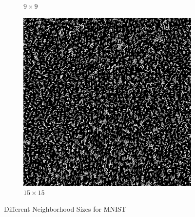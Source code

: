 \documentclass{article}
\begin{document}
\begin{figure}
\begin{subfigure}{0.45\textwidth}
        \caption{$9 \times 9$}
        \label{fig:mnist-patch-9}
    \end{subfigure}
    \begin{subfigure}{0.45\textwidth}
        \centering
        \includegraphics[width=\linewidth]{../Result/mnist-patch-15.png}
        \caption{$15 \times 15$}
        \label{fig:mnist-patch-15}
    \end{subfigure}
    \caption{Different Neighborhood Sizes for MNIST}
    \label{fig:mnist-diff-patch}
\end{figure}
\end{document}

